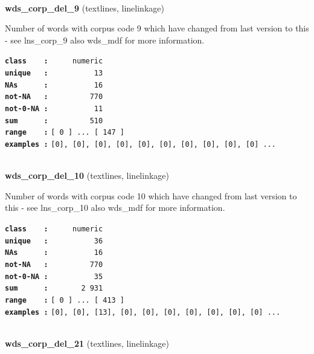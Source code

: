 \documentclass[]{article}
\begin{document}
~

\textbf{wds\_corp\_del\_9} (textlines, linelinkage)

Number of words with corpus code 9 which have changed from last version
to this - see lns\_corp\_9 also wds\_mdf for more information.

\textbf{\texttt{class\ \ \ \ :}} \texttt{~~~~~numeric}\\
\textbf{\texttt{unique\ \ \ :}} \texttt{~~~~~~~~~~13}\\
\textbf{\texttt{NAs\ \ \ \ \ \ :}} \texttt{~~~~~~~~~~16}\\
\textbf{\texttt{not-NA\ \ \ :}} \texttt{~~~~~~~~~770}\\
\textbf{\texttt{not-0-NA\ :}} \texttt{~~~~~~~~~~11}\\
\textbf{\texttt{sum\ \ \ \ \ \ :}} \texttt{~~~~~~~~~510}\\
\textbf{\texttt{range\ \ \ \ :}}
\texttt{{[}\ 0\ {]}\ ...\ {[}\ 147\ {]}}\\
\textbf{\texttt{examples\ :}}
\texttt{{[}0{]},\ {[}0{]},\ {[}0{]},\ {[}0{]},\ {[}0{]},\ {[}0{]},\ {[}0{]},\ {[}0{]},\ {[}0{]},\ {[}0{]}\ ...}\\

~

\textbf{wds\_corp\_del\_10} (textlines, linelinkage)

Number of words with corpus code 10 which have changed from last version
to this - see lns\_corp\_10 also wds\_mdf for more information.

\textbf{\texttt{class\ \ \ \ :}} \texttt{~~~~~numeric}\\
\textbf{\texttt{unique\ \ \ :}} \texttt{~~~~~~~~~~36}\\
\textbf{\texttt{NAs\ \ \ \ \ \ :}} \texttt{~~~~~~~~~~16}\\
\textbf{\texttt{not-NA\ \ \ :}} \texttt{~~~~~~~~~770}\\
\textbf{\texttt{not-0-NA\ :}} \texttt{~~~~~~~~~~35}\\
\textbf{\texttt{sum\ \ \ \ \ \ :}} \texttt{~~~~~~~2~931}\\
\textbf{\texttt{range\ \ \ \ :}}
\texttt{{[}\ 0\ {]}\ ...\ {[}\ 413\ {]}}\\
\textbf{\texttt{examples\ :}}
\texttt{{[}0{]},\ {[}0{]},\ {[}13{]},\ {[}0{]},\ {[}0{]},\ {[}0{]},\ {[}0{]},\ {[}0{]},\ {[}0{]},\ {[}0{]}\ ...}\\

~

\textbf{wds\_corp\_del\_21} (textlines, linelinkage)
\end{document}
